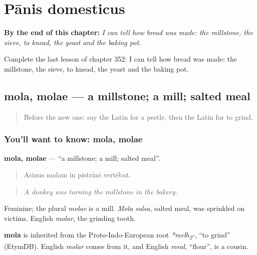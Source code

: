 
\chapter{Pānis domesticus}
\label{ch:la-panis-domesticus}

\begin{chapteropening}
\textbf{By the end of this chapter:} \emph{I can tell how bread was made: the millstone, the sieve, to knead, the yeast and the baking pot.}

Complete the last lesson of chapter 352: I can tell how bread was made: the millstone, the sieve, to knead, the yeast and the baking pot.
\end{chapteropening}

\section[mola, molae]{mola, molae — a millstone; a mill; salted meal}

\label{lesson:LA-C352-mola}



\begin{quote}
Before the new one: say the Latin for a pestle, then the Latin for to grind.
\end{quote}

\subsection*{You'll want to know: mola, molae}
\textbf{mola, molae} — \textquotedblleft{}a millstone; a mill; salted meal\textquotedblright{}.

\begin{quote}
Asinus molam in pistrīnō vertēbat.
\end{quote}

\begin{quote}
\emph{A donkey was turning the millstone in the bakery.}
\end{quote}

Feminine; the plural \emph{molae} is a mill. \emph{Mola salsa}, salted meal, was sprinkled on victims. English \emph{molar}, the grinding tooth.

\begin{cousinweb}
\textbf{mola} is inherited from the Proto-Indo-European root \emph{*melh\textsubscript{2}-}, \textquotedblleft{}to grind\textquotedblright{} (EtymDB). English \emph{molar} comes from it, and English \emph{meal}, \textquotedblleft{}flour\textquotedblright{}, is a cousin.
\end{cousinweb}


